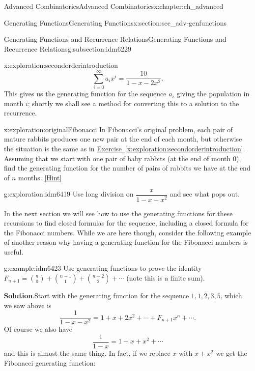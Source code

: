 \documentclass[oneside,10pt,]{book}
\numberwithin{equation}{chapter}
\begin{document}
\begin{chapterptx}{Advanced Combinatorics}{}{Advanced Combinatorics}{}{}{x:chapter:ch_advanced}
\begin{sectionptx}{Generating Functions}{}{Generating Functions}{}{}{x:section:sec_adv-genfunctions}
\begin{subsectionptx}{Generating Functions and Recurrence Relations}{}{Generating Functions and Recurrence Relations}{}{}{g:subsection:idm6229}
\begin{exploration}{}{x:exploration:secondorderintroduction}
\begin{equation*}
\sum_{i=0}^\infty a_ix^i = \frac{10}{1-x-2x^2}.
\end{equation*}
This gives us the generating function for the sequence \(a_i\) giving the population in month \(i\); shortly we shall see a method for converting this to a solution to the recurrence.%
\end{exploration}
\begin{exploration}{}{x:exploration:originalFibonacci}%
In Fibonacci's original problem, each pair of mature rabbits produces one new pair at the end of each month, but otherwise the situation is the same as in \hyperref[x:exploration:secondorderintroduction]{Exercise~\ref{x:exploration:secondorderintroduction}}.  Assuming that we start with one pair of baby rabbits (at the end of month 0), find the generating function for the number of pairs of rabbits we have at the end of \(n\) months.%
\space\hspace*{0pt}\hfill{\tiny\hyperlink{g:hint:idm6405-back}{[Hint]}}\end{exploration}
\begin{exploration}{}{g:exploration:idm6419}%
Use long division on \(\dfrac{x}{1-x-x^2}\) and see what pops out.%
\end{exploration}
In the next section we will see how to use the generating functions for these recursions to find closed formulas for the sequence, including a closed formula for the Fibonacci numbers.  While we are here though, consider the following example of another reason why having a generating function for the Fibonacci numbers is useful.%
\begin{example}{}{g:example:idm6423}%
Use generating functions to prove the identity \(F_{n+1} = \binom{n}{0} + \binom{n-1}{1} + \binom{n-2}{2} + \cdots \) (note this is a finite sum).%
\par\smallskip%
\noindent\textbf{Solution}.\hypertarget{g:solution:idm6427}{}\quad{}Start with the generating function for the sequence \(1, 1, 2, 3, 5\), which we saw above is%
\begin{equation*}
\frac{1}{1-x-x^2} = 1 + x + 2x^2 + \cdots + F_{n+1}x^n+ \cdots\text{.}
\end{equation*}
Of course we also have%
\begin{equation*}
\frac{1}{1-x} = 1 + x + x^2 + \cdots
\end{equation*}
and this is almost the same thing.  In fact, if we replace \(x\) with \(x+x^2\) we get the Fibonacci generating function:%
\begin{align*}

\end{align*}
\end{example}
\end{subsectionptx}
\end{sectionptx}
\end{chapterptx}
\end{document}

